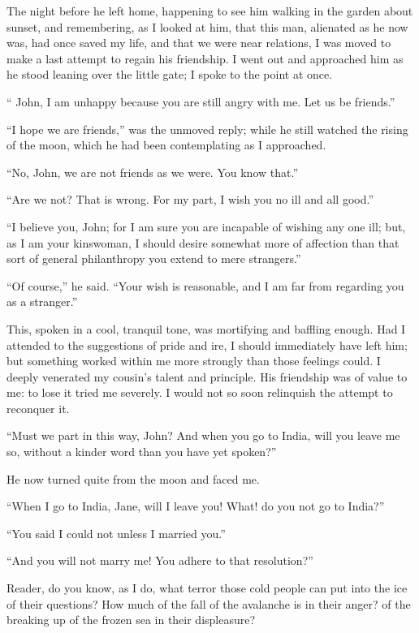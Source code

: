 The night before he left home, happening to see him walking in the
garden about sunset, and remembering, as I looked at him, that this man,
alienated as he now was, had once saved my life, and that we were near
relations, I was moved to make a last attempt to regain his friendship. 
I went out and approached him as he stood leaning over the little gate;
I spoke to the point at once.

\enquote{\St{} John, I am unhappy because you are still angry with me. 
Let us be friends.}

\enquote{I hope we are friends,} was the unmoved reply; while he still
watched the rising of the moon, which he had been contemplating as I
approached.

\enquote{No, \St{} John, we are not friends as we were. You know that.}

\enquote{Are we not? That is wrong. For my part, I wish you no ill and
all good.}

\enquote{I believe you, \St{} John; for I am sure you are incapable of
wishing any one ill; but, as I am your kinswoman, I should desire
somewhat more of affection than that sort of general philanthropy you
extend to mere strangers.}

\enquote{Of course,} he said. \enquote{Your wish is reasonable, and I
am far from regarding you as a stranger.}

This, spoken in a cool, tranquil tone, was mortifying and baffling
enough. Had I attended to the suggestions of pride and ire, I should
immediately have left him; but something worked within me more strongly
than those feelings could. I deeply venerated my cousin's talent and
principle. His friendship was of value to me: to lose it tried me
severely. I would not so soon relinquish the attempt to reconquer it.

\enquote{Must we part in this way, \St{} John? And when you go to India,
will you leave me so, without a kinder word than you have yet spoken?}

He now turned quite from the moon and faced me.

\enquote{When I go to India, Jane, will I leave you! What! do you not
go to India?}

\enquote{You said I could not unless I married you.}

\enquote{And you will not marry me! You adhere to that resolution?}

Reader, do you know, as I do, what terror those cold people can put into
the ice of their questions? How much of the fall of the avalanche is in
their anger? of the breaking up of the frozen sea in their displeasure?


